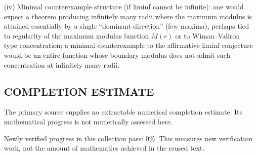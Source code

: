 (iv) Minimal counterexample structure (if liminf cannot be infinite): one would expect a theorem producing infinitely many radii where the maximum modulus is attained essentially by a single ``dominant direction'' (few maxima), perhaps tied to regularity of the maximum modulus function \(M(r)\) or to Wiman--Valiron type concentration; a minimal counterexample to the affirmative liminf conjecture would be an entire function whose boundary modulus does not admit such concentration at infinitely many radii.




\subsection*{COMPLETION ESTIMATE}
The primary source supplies no extractable numerical completion estimate. Its mathematical progress is not numerically assessed here.

Newly verified progress in this collection pass: $0\%$. This measures new verification work, not the amount of mathematics achieved in the reused text.
